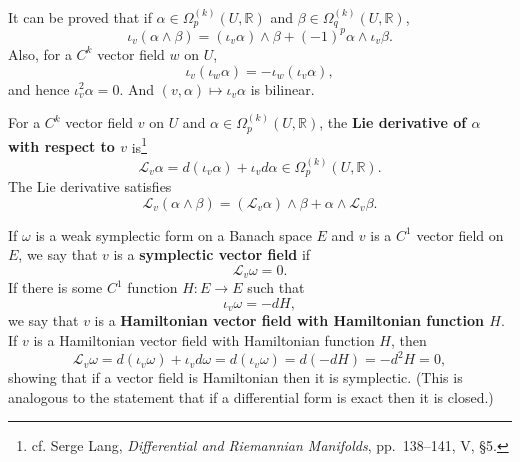\documentclass{article}
\theoremstyle{definition}
\begin{document}
It can be proved that if $\alpha \in \Omega_p^{(k)}(U,\mathbb{R})$
and $\beta \in \Omega_q^{(k)}(U,\mathbb{R})$,
\[
\iota_v(\alpha \wedge \beta) = (\iota_v \alpha) \wedge \beta + (-1)^p \alpha \wedge \iota_v \beta.
\]
Also, for a $C^k$ vector field $w$ on $U$,
\[
\iota_v(\iota_w \alpha) = - \iota_w(\iota_v \alpha),
\]
and hence $\iota_v^2 \alpha=0$. And $(v,\alpha) \mapsto \iota_v \alpha$ is bilinear.

For a $C^k$ vector field $v$ on $U$ and $\alpha \in \Omega_p^{(k)}(U,\mathbb{R})$, the \textbf{Lie
derivative of $\alpha$ with respect to $v$} is\footnote{cf. Serge Lang,
{\em Differential and Riemannian Manifolds}, pp.~138--141, V, \S 5.}
\[
\mathscr{L}_v \alpha  = d(\iota_v \alpha)+\iota_v d\alpha \in \Omega_p^{(k)}(U,\mathbb{R}).
\]
The Lie derivative satisfies 
\[
\mathscr{L}_v(\alpha \wedge \beta) = (\mathscr{L}_v \alpha) \wedge \beta + \alpha \wedge \mathscr{L}_v
\beta.
\]

If $\omega$ is a weak symplectic form on a Banach space $E$ and 
$v$ is a $C^1$ vector field on $E$,
we say that $v$ is a \textbf{symplectic vector field} if
\[
\mathscr{L}_v \omega = 0.
\]
If there is some $C^1$ function $H:E \to E$ such that
\[
\iota_v \omega = - dH,
\]
we say that $v$ is a \textbf{Hamiltonian vector field with Hamiltonian function $H$}.
If $v$ is a Hamiltonian vector field with Hamiltonian function $H$, then
\[
\mathscr{L}_v \omega = d(\iota_v \omega) + \iota_v d\omega
=d(\iota_v \omega)
=d(-dH)
=-d^2H=0,
\]
showing that if a vector field is Hamiltonian then it is symplectic. (This is analogous to the statement that if a differential form is exact
then it is closed.)
\end{document}
